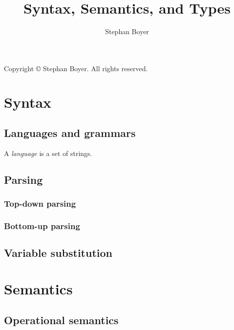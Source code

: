 \documentclass[ebook,oneside]{memoir} %
\title{Syntax, Semantics, and Types}
\author{Stephan Boyer}
\date{}
\begin{document}
  

  \frontmatter

    

    \pagebreak
    \hspace{0pt}
    \vfill
      \begin{center}
        Copyright \copyright{} \the\year{} Stephan Boyer. All rights reserved.
      \end{center}
    \vfill
    \hspace{0pt}
    \pagebreak

    

    \cleardoublepage
    \tableofcontents

  \mainmatter

    \part{Syntax}

      \chapter{Languages and grammars}

        A \emph{language} is a set of strings.

      \chapter{Parsing}

        \section{Top-down parsing}

        \section{Bottom-up parsing}

      \chapter{Variable substitution}

    \part{Semantics}

      \chapter{Operational semantics}
\end{document}
